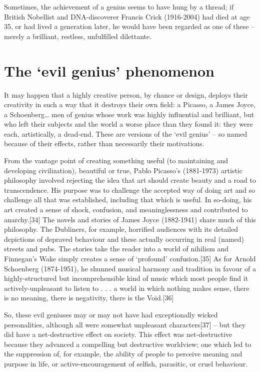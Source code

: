 \documentclass[
]{book}
\begin{document}
Sometimes, the achievement of a genius seems to have hung by a thread; if British Nobellist and DNA-discoverer Francis Crick (1916-2004) had died at age 35, or had lived a generation later, he would have been regarded as one of these -- merely a brilliant, restless, unfulfilled dilettante.

\hypertarget{the-evil-genius-phenomenon}{%
\section{The `evil genius' phenomenon}\label{the-evil-genius-phenomenon}}

It may happen that a highly creative person, by chance or design, deploys their creativity in such a way that it destroys their own field: a Picasso, a James Joyce, a Schoenberg\ldots{} men of genius whose work was highly influential and brilliant, but who left their subjects and the world a worse place than they found it: they were each, artistically, a dead-end. These are versions of the `evil genius' -- so named because of their effects, rather than necessarily their motivations.

From the vantage point of creating something useful (to maintaining and developing civilization), beautiful or true, Pablo Picasso's (1881-1973) artistic philosophy involved rejecting the idea that art should create beauty and a road to transcendence. His purpose was to challenge the accepted way of doing art and so challenge all that was established, including that which is useful. In so-doing, his art created a sense of shock, confusion, and meaninglessness and contributed to anarchy.{[}34{]} The novels and stories of James Joyce (1882-1941) share much of this philosophy. The Dubliners, for example, horrified audiences with its detailed depictions of depraved behaviour and these actually occurring in real (named) streets and pubs. The stories take the reader into a world of nihilism and Finnegan's Wake simply creates a sense of `profound' confusion.{[}35{]} As for Arnold Schoenberg (1874-1951), he shunned musical harmony and tradition in favour of a highly-structured but incomprehensible kind of music which most people find it actively-unpleasant to listen to . . . a world in which nothing makes sense, there is no meaning, there is negativity, there is the Void.{[}36{]}

So, these evil geniuses may or may not have had exceptionally wicked personalities, although all were somewhat unpleasant characters{[}37{]} -- but they did have a net-destructive effect on society. This effect was net-destructive because they advanced a compelling but destructive worldview; one which led to the suppression of, for example, the ability of people to perceive meaning and purpose in life, or active-encouragement of selfish, parasitic, or cruel behaviour.
\end{document}
